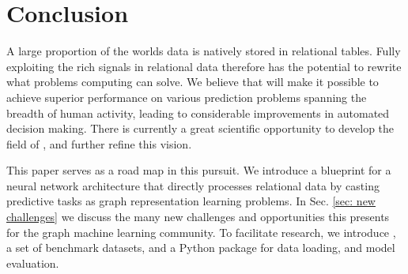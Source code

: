 \section{Conclusion}


A large proportion of the worlds data is natively stored in relational tables. Fully exploiting the rich signals in relational data therefore has the potential to rewrite what problems computing can solve. We believe that \AreaName will make it possible to achieve superior performance on various prediction problems spanning the breadth of human activity, leading to considerable improvements in automated decision making.  There is currently a great scientific opportunity to develop the field of \AreaName, and further refine this vision.

This paper serves as a road map in this pursuit. We introduce a blueprint for a neural network architecture  that directly processes relational data by casting predictive tasks as graph representation learning problems. In Sec. \ref{sec: new challenges} we discuss the many new challenges and opportunities this presents for the graph machine learning community. To facilitate research, we introduce \BenchmarkName, a set of benchmark datasets, and a Python package for data loading, and model evaluation. 



